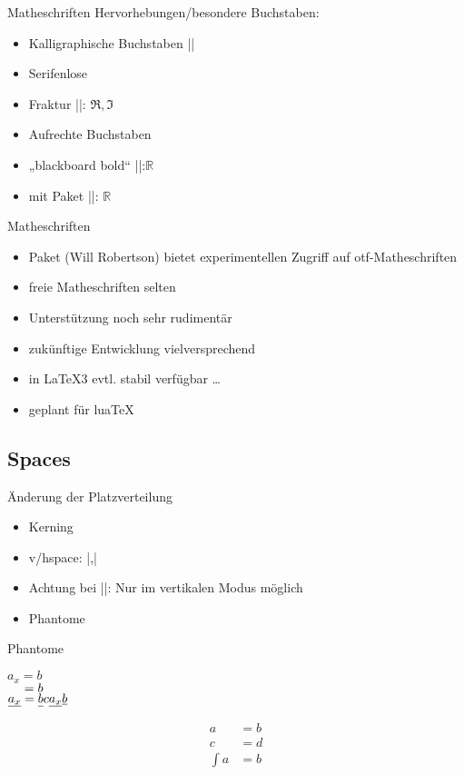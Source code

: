 \documentclass[
	vorläufig=false,
	datum=2017-11-17,
	titel={Mathematiksatz II},
	web=true,
	mo,
	aspectratio=1610,
]{../tex/latexkurs-slides}
\begin{document}
\begin{frame}[fragile]{Matheschriften}
Hervorhebungen/besondere Buchstaben:
\begin{itemize}
\item Kalligraphische Buchstaben |\mathcal|
\item Serifenlose
\item Fraktur |\Re \Im|: \hfill $\Re, \Im$
\item Aufrechte Buchstaben
\item „blackboard bold“ ||:\hfill $\mathbb R$
\item mit Paket  ||: \hfill$\mathds{R}$
\end{itemize} 
\end{frame}

\begin{frame}[fragile]{Matheschriften}
\begin{itemize}
\item Paket  (Will Robertson) bietet experimentellen Zugriff auf otf-Matheschriften
\item freie Matheschriften selten
\item Unterstützung noch sehr rudimentär
\item zukünftige Entwicklung vielversprechend
\item in \LaTeX3 evtl. stabil verfügbar \dots
\item geplant für lua\TeX
\end{itemize}
\end{frame}


\subsection{Spaces}
\begin{frame}[fragile]{Änderung der Platzverteilung}
\begin{itemize}
\item Kerning
\item v/hspace: |\hspace{1cm},\hspace*{1cm}|
\item Achtung bei |\vspace|: Nur im vertikalen Modus möglich
\item Phantome
\end{itemize}
\end{frame}

\begin{frame}[fragile]{Phantome}
\begin{LTXexample}[width=.4\textwidth]
$a_x = b$\\
$\hphantom{a_x} = b$\\
$\underline{a_x} = \underline{b\vphantom{a_x}} c \underline{a_x} \underline b$
\end{LTXexample}
\begin{LTXexample}
\begin{align*}
a &= b\\
c &= d\\
\int a &= b
\end{align*}
\end{LTXexample}
\end{frame}
\end{document}
